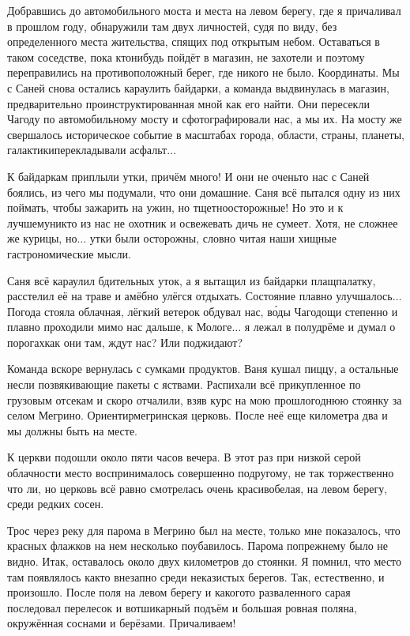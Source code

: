 Добравшись до автомобильного моста и места на левом берегу, где я причаливал в прошлом году, обнаружили там двух личностей, судя по виду, без определенного места жительства, спящих под открытым небом. Оставаться в таком соседстве, пока кто\sdash нибудь пойдёт в магазин, не захотели и поэтому переправились на противоположный берег, где никого не было. Координаты\mdash \CoordsChagodoschaSixteenGoToStore. Мы с Саней снова остались караулить байдарки, а команда выдвинулась в магазин, предварительно проинструктированная мной как его найти. Они пересекли Чагоду по автомобильному мосту и сфотографировали нас, а мы их. На мосту же свершалось историческое событие в масштабах города, области, страны, планеты, галактики\mdash  перекладывали асфальт$\ldots$ 

К байдаркам приплыли утки, причём много! И они не очень\sdash то нас с Саней боялись, из чего мы подумали, что они домашние. Саня всё пытался одну из них поймать, чтобы зажарить на ужин, но тщетно\mdash осторожные! Но это и к лучшему\mdash никто из нас не охотник и освежевать дичь не сумеет. Хотя, не сложнее же курицы, но$\ldots$ утки были осторожны, словно читая наши хищные гастрономические мысли.

Саня всё караулил бдительных уток, а я вытащил из байдарки плащ\sdash палатку, расстелил её на траве и амёбно улёгся отдыхать. Состояние плавно улучшалось$\ldots$ Погода стояла облачная, лёгкий ветерок обдувал нас, в\'{о}ды Чагодощи степенно и плавно проходили мимо нас дальше, к Мологе$\ldots$ я лежал в полудрёме и думал о порогах\mdash как они там, ждут нас? Или поджидают?

Команда вскоре вернулась с сумками продуктов. Ваня кушал пиццу, а остальные несли позвякивающие пакеты с яствами. Распихали всё прикупленное по грузовым отсекам и скоро отчалили, взяв курс на мою прошлогоднюю стоянку за селом Мегрино. Ориентир\mdash мегринская церковь. После неё еще километра два и мы должны быть на месте.

К церкви подошли около пяти часов вечера. В этот раз при низкой серой облачности место воспринималось совершенно по\sdash другому, не так торжественно что ли, но церковь всё равно смотрелась очень красиво\mdash белая, на левом берегу, среди редких сосен.
 
Трос через реку для парома в Мегрино был на месте, только мне показалось, что красных флажков на нем несколько поубавилось. Парома по\sdash прежнему было не видно. Итак, оставалось около двух километров до стоянки. Я помнил, что место там появлялось как\sdash то внезапно среди неказистых берегов. Так, естественно, и произошло. После поля на левом берегу и какого\sdash то разваленного сарая последовал перелесок и вот\mdash шикарный подъём и большая ровная поляна, окружённая соснами и берёзами. Причаливаем! 

